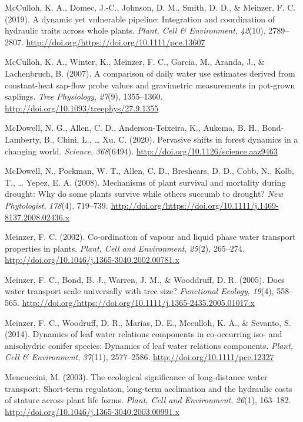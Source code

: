 \documentclass[11pt,twoside]{reedthesis}
\begin{document}
\hypertarget{ref-McCulloh2019}{}
McCulloh, K. A., Domec, J.-C., Johnson, D. M., Smith, D. D., \& Meinzer,
F. C. (2019). A dynamic yet vulnerable pipeline: Integration and
coordination of hydraulic traits across whole plants. \emph{Plant, Cell
\& Environment}, \emph{42}(10), 2789--2807.
\url{http://doi.org/https://doi.org/10.1111/pce.13607}

\hypertarget{ref-McCulloh2007}{}
McCulloh, K. A., Winter, K., Meinzer, F. C., Garcia, M., Aranda, J., \&
Lachenbruch, B. (2007). A comparison of daily water use estimates
derived from constant-heat sap-flow probe values and gravimetric
measurements in pot-grown saplings. \emph{Tree Physiology},
\emph{27}(9), 1355--1360.
\url{http://doi.org/10.1093/treephys/27.9.1355}

\hypertarget{ref-McDowell2020}{}
McDowell, N. G., Allen, C. D., Anderson-Teixeira, K., Aukema, B. H.,
Bond-Lamberty, B., Chini, L., \ldots{} Xu, C. (2020). Pervasive shifts
in forest dynamics in a changing world. \emph{Science},
\emph{368}(6494). \url{http://doi.org/10.1126/science.aaz9463}

\hypertarget{ref-McDowell2008}{}
McDowell, N., Pockman, W. T., Allen, C. D., Breshears, D. D., Cobb, N.,
Kolb, T., \ldots{} Yepez, E. A. (2008). Mechanisms of plant survival and
mortality during drought: Why do some plants survive while others
succumb to drought? \emph{New Phytologist}, \emph{178}(4), 719--739.
\url{http://doi.org/https://doi.org/10.1111/j.1469-8137.2008.02436.x}

\hypertarget{ref-meinzer_co-ordination_2002}{}
Meinzer, F. C. (2002). Co-ordination of vapour and liquid phase water
transport properties in plants. \emph{Plant, Cell and Environment},
\emph{25}(2), 265--274.
\url{http://doi.org/10.1046/j.1365-3040.2002.00781.x}

\hypertarget{ref-Meinzer2005}{}
Meinzer, F. C., Bond, B. J., Warren, J. M., \& Wooddruff, D. R. (2005).
Does water transport scale universally with tree size? \emph{Functional
Ecology}, \emph{19}(4), 558--565.
\url{http://doi.org/https://doi.org/10.1111/j.1365-2435.2005.01017.x}

\hypertarget{ref-meinzer_dynamics_2014}{}
Meinzer, F. C., Woodruff, D. R., Marias, D. E., Mcculloh, K. A., \&
Sevanto, S. (2014). Dynamics of leaf water relations components in
co-occurring iso- and anisohydric conifer species: Dynamics of leaf
water relations components. \emph{Plant, Cell \& Environment},
\emph{37}(11), 2577--2586. \url{http://doi.org/10.1111/pce.12327}

\hypertarget{ref-mencuccini_ecological_2003}{}
Mencuccini, M. (2003). The ecological significance of long-distance
water transport: Short-term regulation, long-term acclimation and the
hydraulic costs of stature across plant life forms. \emph{Plant, Cell
and Environment}, \emph{26}(1), 163--182.
\url{http://doi.org/10.1046/j.1365-3040.2003.00991.x}
\end{document}
